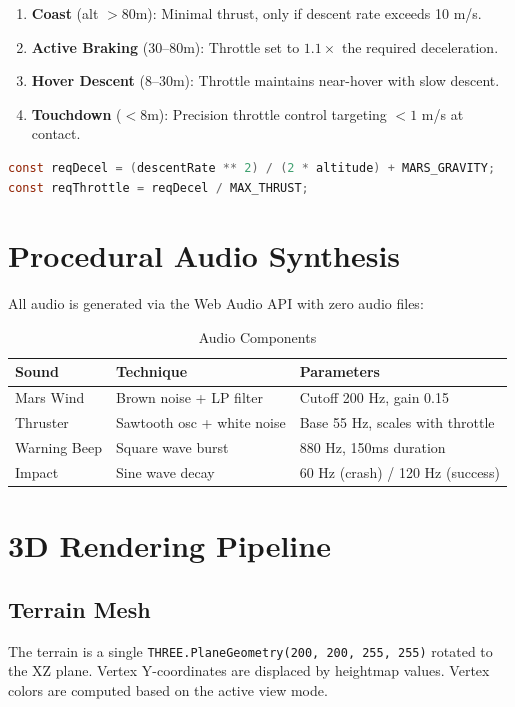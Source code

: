 \begin{enumerate}
    \item \textbf{Coast} (alt $> 80$m): Minimal thrust, only if descent rate exceeds 10 m/s.
    \item \textbf{Active Braking} (30--80m): Throttle set to $1.1\times$ the required deceleration.
    \item \textbf{Hover Descent} (8--30m): Throttle maintains near-hover with slow descent.
    \item \textbf{Touchdown} ($< 8$m): Precision throttle control targeting $< 1$ m/s at contact.
\end{enumerate}

\begin{lstlisting}[language=Java, caption={Autopilot Required Deceleration Computation}]
const reqDecel = (descentRate ** 2) / (2 * altitude) + MARS_GRAVITY;
const reqThrottle = reqDecel / MAX_THRUST;
\end{lstlisting}

\section{Procedural Audio Synthesis}
All audio is generated via the Web Audio API \cite{webaudio} with zero audio files:

\begin{table}[h]
\centering
\caption{Audio Components}
\begin{tabular}{|p{3cm}|p{3cm}|p{6cm}|}
\hline
\textbf{Sound} & \textbf{Technique} & \textbf{Parameters} \\
\hline
Mars Wind & Brown noise + LP filter & Cutoff 200 Hz, gain 0.15 \\
\hline
Thruster & Sawtooth osc + white noise & Base 55 Hz, scales with throttle \\
\hline
Warning Beep & Square wave burst & 880 Hz, 150ms duration \\
\hline
Impact & Sine wave decay & 60 Hz (crash) / 120 Hz (success) \\
\hline
\end{tabular}
\end{table}

\section{3D Rendering Pipeline}

\subsection{Terrain Mesh}
The terrain is a single \texttt{THREE.PlaneGeometry(200, 200, 255, 255)} rotated to the XZ plane. Vertex Y-coordinates are displaced by heightmap values. Vertex colors are computed based on the active view mode.

